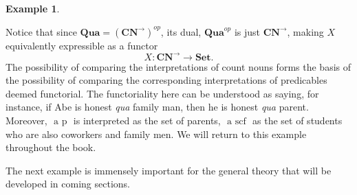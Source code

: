 \documentclass[11pt]{book}
\theoremstyle{definition}
\newtheorem{example}{Example}[section]
\theoremstyle{definition}
\theoremstyle{definition}
\theoremstyle{theorem}
\theoremstyle{definition}
\begin{document}
\begin{example}
\begin{enumerate}
		\end{enumerate} \noindent 
	Notice that since $\textbf{Qua} = (\textbf{CN}^{\rightarrow})^{op}$, its dual, $\textbf{Qua}^{op}$ is just $\textbf{CN}^{\rightarrow}$, making $X$ equivalently expressible as a functor 
	\begin{equation}
	X: \textbf{CN}^{\rightarrow} \rightarrow \textbf{Set}. 
	\end{equation}
	The possibility of comparing the interpretations of count nouns forms the basis of the possibility of comparing the corresponding interpretations of predicables deemed functorial. The functoriality here can be understood as saying, for instance, if Abe is honest \textit{qua} family man, then he is honest \textit{qua} parent. Moreover, $\boxed{\text{ a p }}$ is interpreted as the set of parents, $\boxed{\text{ a scf }}$ as the set of students who are also coworkers and family men. We will return to this example throughout the book. 
\end{example}
The next example is immensely important for the general theory that will be developed in coming sections. 
\end{document}
